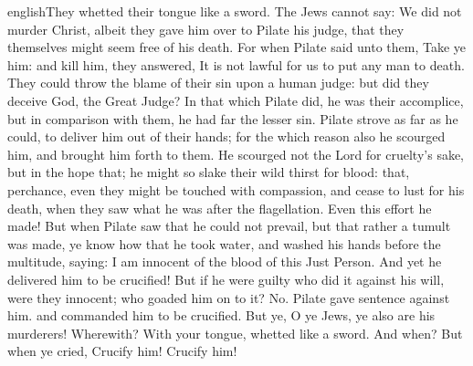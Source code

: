 {english}{They whetted their tongue like a sword. The Jews cannot say: We did not murder Christ, albeit they gave him over to Pilate his judge, that they themselves might seem free of his death. For when Pilate said unto them, Take ye him: and kill him, they answered, It is not lawful for us to put any man to death. They could throw the blame of their sin upon a human judge: but did they deceive God, the Great Judge? In that which Pilate did, he was their accomplice, but in comparison with them, he had far the lesser sin. Pilate strove as far as he could, to deliver him out of their hands; for the which reason also he scourged him, and brought him forth to them. He scourged not the Lord for cruelty's sake, but in the hope that; he might so slake their wild thirst for blood: that, perchance, even they might be touched with compassion, and cease to lust for his death, when they saw what he was after the flagellation. Even this effort he made! But when Pilate saw that he could not prevail, but that rather a tumult was made, ye know how that he took water, and washed his hands before the multitude, saying: I am innocent of the blood of this Just Person. And yet he delivered him to be crucified! But if he were guilty who did it against his will, were they innocent; who goaded him on to it? No. Pilate gave sentence against him. and commanded him to be crucified. But ye, O ye Jews, ye also are his murderers! Wherewith? With your tongue, whetted like a sword. And when? But when ye cried, Crucify him! Crucify him!}